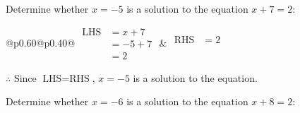 \documentclass[12pt]{article}
\newcounter{minipagecount}
\begin{document}
\begin{multicols}{2}
\begin{minipage}[t]{0.40\textwidth}
    \noindent Determine whether \(x = -5\) is a solution to the equation \(x + 7 = 2\):
    \vspace{4pt}  %

    \noindent
    \renewcommand{\arraystretch}{1.3} %
    \begin{tabular}{@{}p{0.60\linewidth}@{}p{0.40\linewidth}@{}}
        \(\begin{aligned}
            \text{LHS} &= x + 7 \\
                    &= -5 + 7 \\
                    &= 2
        \end{aligned}\) &
        \(\begin{aligned}
            \text{RHS} &= 2\\
                    & \\
                    &
        \end{aligned}\)
    \end{tabular}
    \renewcommand{\arraystretch}{1.0} %
    \vspace{2pt}  %

    \noindent \(\therefore\) Since \(\text{LHS} = \text{RHS}\), \(x = -5\) is  a solution to the equation.

\end{minipage}

 \vspace*{16pt}
\noindent{(\theminipagecount)}\hspace{0.1mm} %
\begin{minipage}[t]{0.40\textwidth} %

    \noindent Determine whether \(x = -6\) is a solution to the equation \(x + 8 = 2\):
    \vspace{4pt}  %


\end{minipage}
\end{multicols}
\end{document}
